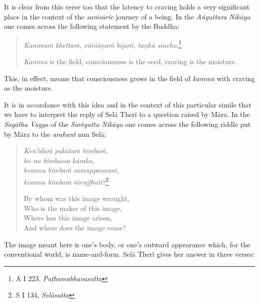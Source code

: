 It is clear from this verse too that the latency to craving holds a very significant place in the context of the \emph{saṁsāric} journey of a being. In the \emph{Aṅguttara Nikāya} one comes across the following statement by the Buddha:

\begin{quote}
\emph{Kammaṁ khettaṁ, viññāṇaṁ bījaṁ, taṇhā sineho}.\footnote{A I 223, \emph{Paṭhamabhavasutta}}

\emph{Kamma} is the field, consciousness is the seed, craving is the moisture.
\end{quote}

This, in effect, means that consciousness grows in the field of \emph{kamma} with craving as the moisture.

It is in accordance with this idea and in the context of this particular simile that we have to interpret the reply of Selā Therī to a question raised by Māra. In the \emph{Sagātha Vagga} of the \emph{Saṁyutta Nikāya} one comes across the following riddle put by Māra to the \emph{arahant} nun Selā:

\begin{quote}
\emph{Ken'idaṁ pakataṁ bimbaṁ,}\\
\emph{ko nu bimbassa kārako,}\\
\emph{kvannu bimbaṁ samuppannaṁ,}\\
\emph{kvannu bimbaṁ nirujjhati?}\footnote{S I 134, \emph{Selāsutta}}

By whom was this image wrought,\\
Who is the maker of this image,\\
Where has this image arisen,\\
And where does the image cease?
\end{quote}

The image meant here is one's body, or one's outward appearance which, for the conventional world, is name-and-form. Selā Therī gives her answer in three verses:

